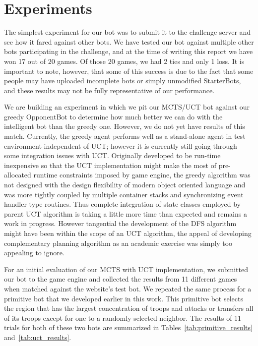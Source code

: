 \documentclass[a4paper,11pt]{article}
\begin{document}
\section{Experiments}\label{sec:experiments}
The simplest experiment for our bot was to submit it to the challenge server and see how it 
fared against other bots.  We have tested our bot against multiple other bots participating 
in the challenge, and at the time of writing this report we have won 17 out of 20 games.  
Of those 20 games, we had 2 ties and only 1 loss. It is important to note, however, that
some of this success is due to the fact that some people may have uploaded incomplete bots or 
simply unmodified StarterBots, and these results may not be fully representative of our performance.

We are building an experiment in which we pit our MCTS/UCT bot against our greedy 
OpponentBot to determine how much better we can do with the intelligent bot than the greedy 
one.  However, we do not yet have results of this match. Currently, the greedy agent performs 
well as a stand-alone agent in test environment independent of UCT; however it is currently 
still going through some integration issues with  UCT. Originally developed to be run-time 
inexpensive so that the UCT implementation might make the most of pre-allocated runtime 
constraints imposed by game engine, the greedy algorithm was not designed with the design 
flexibility of modern object oriented language and was more tightly coupled by multiple 
container stacks and synchronizing event handler type routines. Thus complete integration 
of state classes employed by parent UCT algorithm is taking a little more time than expected 
and remains a work in progress. However tangential the development of the DFS algorithm might 
have been within the scope of an UCT algorithm, the appeal of developing complementary planning 
algorithm as an academic exercise was simply too appealing to ignore.

For an initial evaluation of our MCTS with UCT implementation, we submitted our bot to the game 
engine and collected the results from 11 different games when matched against the website's test 
bot. We repeated the same process for a primitive bot that we developed earlier in this work.  
This primitive bot selects the region that has the largest concentration of troops and attacks 
or transfers all of its troops except for one to a randomly-selected neighbor. The results of 
11 trials for both of these two bots are summarized in Tables~\ref{tab:primitive_results} 
and~\ref{tab:uct_results}.
\end{document}
